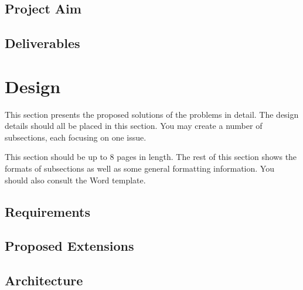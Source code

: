 \documentclass[12pt,a4paper]{article}
\begin{document}




\subsection{Project Aim}


\subsection{Deliverables}


\section{Design}

This section presents the proposed solutions of the problems in detail. The design details should all be placed in this section. You may create a number of subsections, each focusing on one issue.

This section should be up to 8 pages in length.
The rest of this section shows the formats of subsections as well as some general formatting information.  You should also consult the Word template.


\subsection{Requirements}



\subsection{Proposed Extensions}

\subsection{Architecture}
\end{document}
